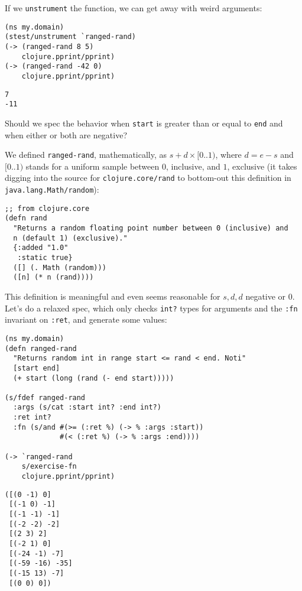 \documentclass[10pt,oneside,x11names]{article}
\begin{document}
If we \texttt{unstrument} the function, we can get away with weird arguments:

\begin{verbatim}
(ns my.domain)
(stest/unstrument `ranged-rand)
(-> (ranged-rand 8 5)
    clojure.pprint/pprint)
(-> (ranged-rand -42 0)
    clojure.pprint/pprint)
\end{verbatim}

\begin{verbatim}
7
-11
\end{verbatim}


Should we spec the behavior when \texttt{start} is
greater than or equal to \texttt{end} and when either or both are negative?

We defined \texttt{ranged-rand}, mathematically, as \(s+d\times{}[0..1)\), where
\(d=e-s\) and \([0..1)\) stands for a uniform sample between \(0\), inclusive, and
\(1\), exclusive (it takes digging into the source for \texttt{clojure.core/rand} to
bottom-out this definition in \texttt{java.lang.Math/random}):

\begin{verbatim}
;; from clojure.core
(defn rand
  "Returns a random floating point number between 0 (inclusive) and
  n (default 1) (exclusive)."
  {:added "1.0"
   :static true}
  ([] (. Math (random)))
  ([n] (* n (rand))))
\end{verbatim}

This definition is meaningful and even seems reasonable for \(s, d, d\) negative
or \(0\). Let's do a relaxed spec, which only checks \texttt{int?} types for arguments
and the \texttt{:fn} invariant on \texttt{:ret}, and generate some values:

\begin{verbatim}
(ns my.domain)
(defn ranged-rand
  "Returns random int in range start <= rand < end. Noti"
  [start end]
  (+ start (long (rand (- end start)))))

(s/fdef ranged-rand
  :args (s/cat :start int? :end int?)
  :ret int?
  :fn (s/and #(>= (:ret %) (-> % :args :start))
             #(< (:ret %) (-> % :args :end))))

(-> `ranged-rand
    s/exercise-fn
    clojure.pprint/pprint)
\end{verbatim}

\begin{verbatim}
([(0 -1) 0]
 [(-1 0) -1]
 [(-1 -1) -1]
 [(-2 -2) -2]
 [(2 3) 2]
 [(-2 1) 0]
 [(-24 -1) -7]
 [(-59 -16) -35]
 [(-15 13) -7]
 [(0 0) 0])
\end{verbatim}
\end{document}
